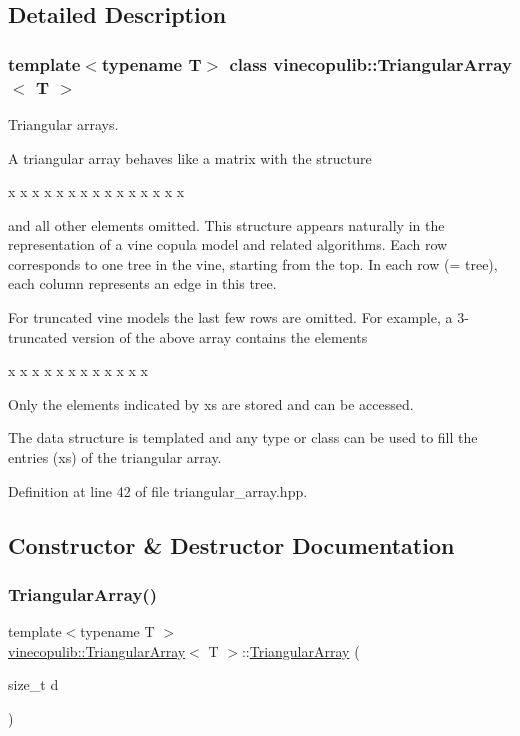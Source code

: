 \subsection{Detailed Description}
\subsubsection*{template$<$typename T$>$\newline
class vinecopulib\+::\+Triangular\+Array$<$ T $>$}

Triangular arrays. 

A triangular array behaves like a matrix with the structure 
\begin{DoxyCode}
x x x x x
x x x x
x x x
x x
x
\end{DoxyCode}
 and all other elements omitted. This structure appears naturally in the representation of a vine copula model and related algorithms. Each row corresponds to one tree in the vine, starting from the top. In each row (= tree), each column represents an edge in this tree.

For truncated vine models the last few rows are omitted. For example, a 3-\/truncated version of the above array contains the elements 
\begin{DoxyCode}
x x x x x
x x x x
x x x
\end{DoxyCode}
 Only the elements indicated by {\ttfamily x}s are stored and can be accessed.

The data structure is templated and any type or class can be used to fill the entries ({\ttfamily x}s) of the triangular array. 

Definition at line 42 of file triangular\+\_\+array.\+hpp.



\subsection{Constructor \& Destructor Documentation}
\mbox{\label{classvinecopulib_1_1_triangular_array_ab291264bdad179aed275517243cdad68}} 
\subsubsection{\texorpdfstring{Triangular\+Array()}{TriangularArray()}\hspace{0.1cm}{\footnotesize\ttfamily [1/2]}}
{\footnotesize\ttfamily template$<$typename T $>$ \\
\hyperlink{classvinecopulib_1_1_triangular_array}{vinecopulib\+::\+Triangular\+Array}$<$ T $>$\+::\hyperlink{classvinecopulib_1_1_triangular_array}{Triangular\+Array} (\begin{DoxyParamCaption}\item[{size\+\_\+t}]{d }\end{DoxyParamCaption})}



